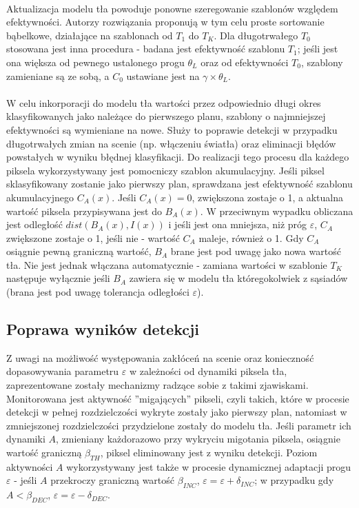  \paragraph{}
Aktualizacja modelu tła powoduje ponowne szeregowanie szablonów względem efektywności. Autorzy rozwiązania proponują w tym celu proste sortowanie bąbelkowe, działające na szablonach od $T_{1}$ do $T_{K}$. Dla długotrwałego $T_{0}$ stosowana jest inna procedura - badana jest efektywność szablonu $T_{1}$; jeśli jest ona większa od pewnego ustalonego progu $\theta_{L}$ oraz od efektywności $T_{0}$, szablony zamieniane są ze sobą, a $C_{0}$ ustawiane jest na $\gamma \times \theta_{L}$.
\paragraph{}
W celu inkorporacji do modelu tła wartości przez odpowiednio długi okres klasyfikowanych jako należące do pierwszego planu, szablony o najmniejszej efektywności są wymieniane na nowe. Służy to poprawie detekcji w przypadku długotrwałych zmian na scenie (np. włączeniu światła) oraz eliminacji błędów powstałych w wyniku błędnej klasyfikacji. Do realizacji tego procesu dla każdego piksela wykorzystywany jest pomocniczy szablon akumulacyjny. Jeśli piksel sklasyfikowany zostanie jako pierwszy plan, sprawdzana jest efektywność szablonu akumulacyjnego $C_{A}(x)$. Jeśli $C_{A}(x)=0$, zwiększona zostaje o 1, a aktualna wartość piksela przypisywana jest do $B_{A}(x)$. W przeciwnym wypadku obliczana jest odległość $dist(B_{A}(x),I(x))$ i jeśli jest ona mniejsza, niż próg $\varepsilon$, $C_{A}$ zwiększone zostaje o 1, jeśli nie - wartość $C_{A}$ maleje, również o 1. Gdy $C_{A}$ osiągnie pewną graniczną wartość, $B_{A}$ brane jest pod uwagę jako nowa wartość tła. Nie jest jednak włączana automatycznie - zamiana wartości w szablonie $T_{K}$ następuje wyłącznie jeśli $B_{A}$ zawiera się w modelu tła któregokolwiek z sąsiadów (brana jest pod uwagę tolerancja odległości $\varepsilon$).
\subsection{Poprawa wyników detekcji}
Z uwagi na możliwość występowania zakłóceń na scenie oraz konieczność dopasowywania parametru $\varepsilon$ w zależności od dynamiki piksela tła, zaprezentowane zostały mechanizmy radzące sobie z takimi zjawiskami. Monitorowana jest aktywność ''migających'' pikseli, czyli takich, które w procesie detekcji w pełnej rozdzielczości wykryte zostały jako pierwszy plan, natomiast w zmniejszonej rozdzielczości przydzielone zostały do modelu tła. Jeśli parametr ich dynamiki $A$, zmieniany każdorazowo przy wykryciu migotania piksela, osiągnie wartość graniczną $\beta_{TH}$, piksel eliminowany jest z wyniku detekcji. Poziom aktywności $A$ wykorzystywany jest także w procesie dynamicznej adaptacji progu $\varepsilon$ - jeśli $A$ przekroczy graniczną wartość $\beta_{INC}$, $\varepsilon = \varepsilon + \delta_{INC}$; w przypadku gdy $A<\beta_{DEC}$, $\varepsilon = \varepsilon - \delta_{DEC}$. \\
